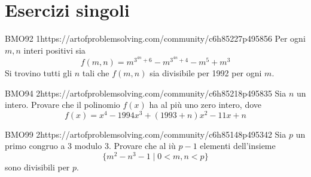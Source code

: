 \documentclass[12pt]{article}
\begin{document}
\section{Esercizi singoli}

\begin{esercizio}{BMO92 1}{https://artofproblemsolving.com/community/c6h85227p495856}
Per ogni $m,n$ interi positivi sia
\[f(m,n)=m^{3^{4n}+6}-m^{3^{4n}+4}-m^{5}+m^{3}\]
Si trovino tutti gli $n$ tali che $f(m,n)$ sia divisibile per 1992 per ogni $m$.
\end{esercizio}

\begin{esercizio}{BMO94 2}{https://artofproblemsolving.com/community/c6h85218p495835}
Sia $n$ un intero. Provare che il polinomio $f(x)$ ha al più uno zero intero, dove
\[f(x)=x^{4}-1994x^{3}+(1993+n)x^{2}-11x+n\]
\end{esercizio}

\begin{esercizio}{BMO99 2}{https://artofproblemsolving.com/community/c6h85148p495342}
Sia $p$ un primo congruo a 3 modulo 3. Provare che al iù $p-1$ elementi dell'insieme 
\[\{m^{2}-n^{3}-1\mid 0<m,n<p\}\]
sono divisibili per $p$.
\end{esercizio}
\end{document}
